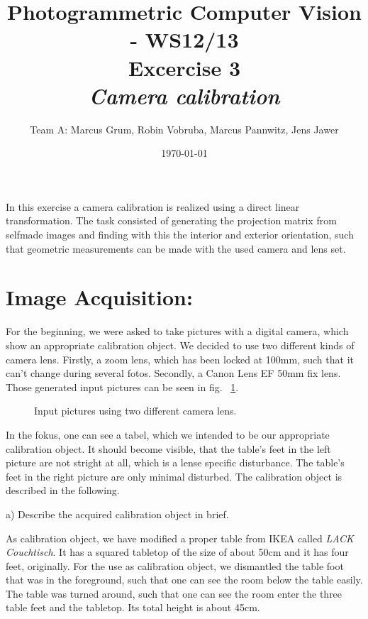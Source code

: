 \documentclass[a4paper,headings=small]{scrartcl}
\title{Photogrammetric Computer Vision - WS12/13 \\ Excercise 3 \\ \emph{Camera calibration}}
\author{Team A: Marcus Grum, Robin Vobruba, Marcus Pannwitz, Jens Jawer}
\date{\today}
\numberwithin{equation}{section} %
\numberwithin{figure}{section}   %
\newcommand{\generatedImgRootImg}{../resources/img}
\begin{document}
\maketitle

In this exercise a camera calibration is realized using a direct linear transformation. 
The task consisted of generating the projection matrix from selfmade images 
and finding with this the interior and exterior orientation, 
such that geometric measurements can be made with the used camera and lens set.

\section{Image Acquisition:}

For the beginning, we were asked to take pictures with a digital camera,
which show an appropriate calibration object. 
We decided to use two different kinds of camera lens.
Firstly, a zoom lens, which has been locked at 100mm, such that it can't change
during several fotos.
Secondly, a Canon Lens EF 50mm fix lens.
Those generated input pictures can be seen in fig. ~\ref{fig:Input pictures}.

\begin{figure}
   \hfill
  \caption{Input pictures using two different camera lens.}
  \label{fig:Input pictures}
\end{figure}

In the fokus, one can see a tabel, which we intended to be our 
appropriate calibration object. It should become visible, 
that the table's feet in the left picture are not stright at all,
which is a lense specific disturbance.
The table's feet in the right picture are only minimal disturbed.
The calibration object is described in the following.

a) Describe the acquired calibration object in brief.

As calibration object, we have modified a proper table from IKEA called \emph{LACK Couchtisch}.
It has a squared tabletop of the size of about 50cm and it has four feet, originally.
For the use as calibration object, we dismantled the table foot
that was in the foreground, such that one can see the room below the table easily.
The table was turned around, such that one can see the room enter the three table feet 
and the tabletop. Its total height is about 45cm.
\end{document}
